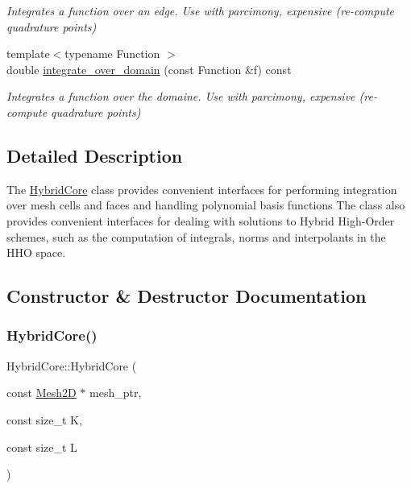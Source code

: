 \begin{DoxyCompactItemize}
\begin{DoxyCompactList}\small\item\em Integrates a function over an edge. Use with parcimony, expensive (re-\/compute quadrature points) \end{DoxyCompactList}\item 
{\footnotesize template$<$typename Function $>$ }\\double \hyperlink{group__HybridCore2D_ga80015207be685d9f8ccb43ac0e814ce7}{integrate\+\_\+over\+\_\+domain} (const Function \&f) const
\begin{DoxyCompactList}\small\item\em Integrates a function over the domaine. Use with parcimony, expensive (re-\/compute quadrature points) \end{DoxyCompactList}\end{DoxyCompactItemize}


\subsection{Detailed Description}
The \hyperlink{classHCore2D_1_1HybridCore}{Hybrid\+Core} class provides convenient interfaces for performing integration over mesh cells and faces and handling polynomial basis functions The class also provides convenient interfaces for dealing with solutions to Hybrid High-\/\+Order schemes, such as the computation of integrals, norms and interpolants in the H\+HO space. 

\subsection{Constructor \& Destructor Documentation}
\mbox{\label{classHCore2D_1_1HybridCore_a77e1aad579b2b484f068790d546a8d77}} 
\subsubsection{\texorpdfstring{Hybrid\+Core()}{HybridCore()}}
{\footnotesize\ttfamily Hybrid\+Core\+::\+Hybrid\+Core (\begin{DoxyParamCaption}\item[{const \hyperlink{classHCore2D_1_1Mesh2D}{Mesh2D} $\ast$}]{mesh\+\_\+ptr,  }\item[{const size\+\_\+t}]{K,  }\item[{const size\+\_\+t}]{L }\end{DoxyParamCaption})}



